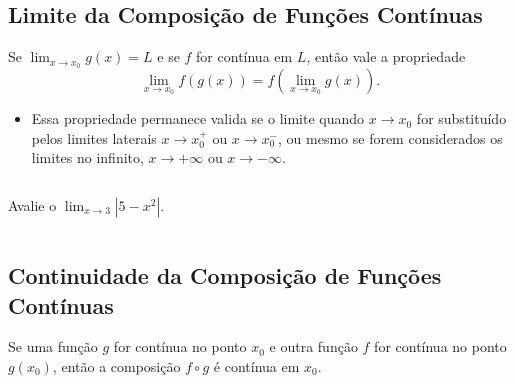 \subsection{Limite da Composição de Funções Contínuas}
\begin{frame}
  \begin{theorem}
    Se $\displaystyle\lim_{x\to x_{0}}{g(x)}=L$ e se $f$ for contínua em $L$, então vale a propriedade
    \begin{equation*}
      \lim_{x\to x_{0}}{f\left(g(x)\right)}=f\left(\lim_{x\to x_{0}}{g(x)}\right).
    \end{equation*}
  \end{theorem}
  \begin{itemize}
    \item Essa propriedade permanece valida se o limite quando $x\to x_{0}$ for substituído pelos limites laterais $x\to x_{0}^{+}$ ou $x\to x_{0}^{-}$, ou mesmo se forem considerados os limites no infinito, $x\to +\infty$ ou $x\to -\infty$.
  \end{itemize}
\end{frame}

\begin{frame}
  \begin{columns}[onlytextwidth]
    \begin{column}{0.49\textwidth}\vspace{-0.5cm}
      \begin{example}
        Avalie o $\displaystyle\lim_{x\to 3}{|5-x^{2}|}$.
      \end{example}
    \end{column}
    \begin{column}{0.49\textwidth}\vspace{-0.5cm}
    \end{column}
  \end{columns}
\end{frame}

\subsection{Continuidade da Composição de Funções Contínuas}
\begin{frame}
  \begin{theorem}
    Se uma função $g$ for contínua no ponto $x_{0}$ e outra função $f$ for contínua no ponto $g(x_{0})$, então a composição $f\circ g$ é contínua em $x_{0}$.
  \end{theorem}
\end{frame}

